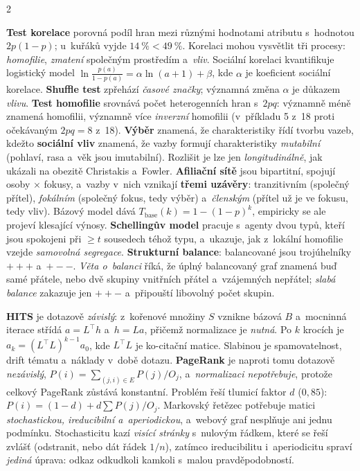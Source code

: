 \documentclass[10pt,a4paper]{article}
\newcommand{\hh}[1]{\par\smallskip\noindent{\bfseries\color{headcol}#1}\par\nobreak\vspace{-0.2em}}
\newcommand{\tm}[1]{\textbf{#1}}
\begin{document}
\begin{multicols}{2}
\hh{Vliv, korelace, homofilie}
\tm{Test korelace} porovná podíl hran mezi různými hodnotami atributu s~hodnotou $2p(1-p)$;
u~kuřáků vyjde $14~\% < 49~\%$. Korelaci mohou vysvětlit tři procesy: \emph{homofilie},
\emph{zmatení} společným prostředím a~\emph{vliv}.
Sociální korelaci kvantifikuje logistický model $\ln\frac{p(a)}{1-p(a)}=\alpha\ln(a+1)+\beta$,
kde $\alpha$ je koeficient sociální korelace. \tm{Shuffle test} zpřehází \emph{časové značky};
významná změna $\alpha$ je důkazem \emph{vlivu}.
\tm{Test homofilie} srovnává počet heterogenních hran s~$2pq$: významně méně znamená homofilii,
významně více \emph{inverzní} homofilii (v~příkladu 5 z~18 proti očekávaným $2pq=8$ z~18).
\tm{Výběr} znamená, že charakteristiky řídí tvorbu vazeb, kdežto \tm{sociální vliv} znamená, že
vazby formují charakteristiky \emph{mutabilní} (pohlaví, rasa a~věk jsou imutabilní). Rozlišit
je lze jen \emph{longitudinálně}, jak ukázali na obezitě Christakis a~Fowler.
\tm{Afiliační sítě} jsou bipartitní, spojují osoby $\times$ fokusy, a~vazby v~nich vznikají
\tm{třemi uzávěry}: tranzitivním (společný přítel), \emph{fokálním} (společný fokus, tedy
výběr) a~\emph{členským} (přítel už je ve fokusu, tedy vliv). Bázový model dává
$T_{\text{base}}(k)=1-(1-p)^k$, empiricky se ale projeví klesající výnosy.
\tm{Schellingův model} pracuje s~agenty dvou typů, kteří jsou spokojeni při $\ge t$ sousedech
téhož typu, a~ukazuje, jak z~lokální homofilie vzejde \emph{samovolná segregace}.
\tm{Strukturní balance}: balancované jsou trojúhelníky $+{+}{+}$ a~$+{-}{-}$. \emph{Věta
o~balanci} říká, že úplný balancovaný graf znamená buď samé přátele, nebo dvě skupiny
vnitřních přátel a~vzájemných nepřátel; \emph{slabá balance} zakazuje jen $+{+}{-}$
a~připouští libovolný počet skupin.

\hh{Autority: HITS a~PageRank}
\tm{HITS} je dotazově \emph{závislý}: z~kořenové množiny $S$ vznikne bázová $B$ a~mocninná
iterace střídá $a=L^{\!\top}h$ a~$h=La$, přičemž normalizace je \emph{nutná}. Po $k$ krocích
je $a_k=(L^{\!\top}L)^{k-1}a_0$, kde $L^{\!\top}L$ je ko-citační matice. Slabinou je
spamovatelnost, drift tématu a~náklady v~době dotazu.
\tm{PageRank} je naproti tomu dotazově \emph{nezávislý}, $P(i)=\sum_{(j,i)\in E}P(j)/O_j$,
a~\emph{normalizaci nepotřebuje}, protože celkový PageRank zůstává konstantní. Problém
 řeší tlumicí faktor $d$ ($0{,}85$): $P(i)=(1-d)+d\sum P(j)/O_j$.
Markovský řetězec potřebuje matici \emph{stochastickou, ireducibilní a~aperiodickou}, a~webový
graf nesplňuje ani jednu podmínku. Stochasticitu kazí \emph{visící stránky} s~nulovým řádkem,
které se řeší zvlášť (odstranit, nebo dát řádek $1/n$), zatímco ireducibilitu i~aperiodicitu
spraví \emph{jediná} úprava: odkaz odkudkoli kamkoli s~malou pravděpodobností.


\end{multicols}
\end{document}
